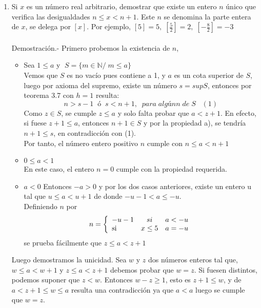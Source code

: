 \begin{enumerate}[\bfseries  1.]
\item Si $x$ es un número real arbitrario, demostrar que existe un entero $n$ único que verifica las desigualdades $n\leq x < n+1$. Este $n$ se denomina la parte entera de $x$, se delega por $[x]$. Por ejemplo, $[5]=5,\; \left[ \frac{5}{2}\right] =2, \; \left[ -\frac{8}{2} \right]=-3$\\\\
Demostración.-\; Primero probemos la existencia de $n$,
\begin{itemize}
\item  Sea $1\leq a $  \; y  \; $\; S=\lbrace m \in \mathbb{N}/\; m \leq a \rbrace$\\ 
Vemos que $S$ es no vacío pues contiene a 1, y \; $a$ \; es un cota superior de $S$, luego por axioma del supremo, existe un número $s=supS$, entonces por teorema 3.7 \; con $h=1$ resulta:
$$n>s-1 \; \; ó \; \; s<n+1, \; \; para \; algún n \; de \; S \; \; \; (1) $$
Como $z \in S$, se cumple $z\leq a$ y solo falta probar que $a<z+1$. En efecto, si fuese $z+1\leq a$, entonces $n+1 \in S$ y por la propiedad a), se tendría $n+1\leq s$, en contradicción con (1).   \\
Por tanto, el número entero positivo $n$ cumple con $n\leq a < n+1$
\item $0\leq a < 1$\\
En este caso, el entero $n=0$ cumple con la propiedad requerida.
\item $a<0$
Entonces $-a>0$ \; y por los dos casos anteriores, existe un entero u tal que $u\leq a< u+1$ de donde $-u-1<a\leq -u$.\\
Definiendo $n$ por  
\begin{equation}
n = \left\lbrace
\begin{array}{lcr}
-u-1 & si & a<-u\\
\textup{si } & x\leq 5 & a=-u
\end{array}        
\right.
\end{equation}
se prueba fácilmente que $z\leq a < z+1$
\end{itemize}
Luego demostramos la unicidad. Sea $w$ y $z$ dos números enteros tal que, $w\leq a < w + 1$ y $z \leq a < z + 1$ debemos probar que $w=z$. Si fuesen distintos, podemos suponer que $z<w$. Entonces $w-z\geq 1$, esto es $z+1\leq w$, y de $a<z+1\leq w \leq a$ resulta una contradicción ya que $a<a$ luego se cumple que $w=z$. \\\\ 


\end{enumerate}
